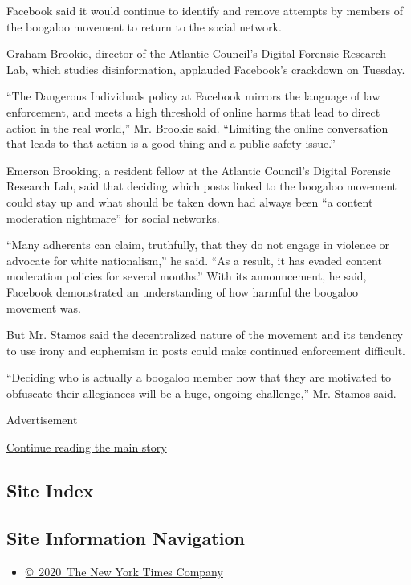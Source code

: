 Facebook said it would continue to identify and remove attempts by
members of the boogaloo movement to return to the social network.

Graham Brookie, director of the Atlantic Council's Digital Forensic
Research Lab, which studies disinformation, applauded Facebook's
crackdown on Tuesday.

``The Dangerous Individuals policy at Facebook mirrors the language of
law enforcement, and meets a high threshold of online harms that lead to
direct action in the real world,'' Mr. Brookie said. ``Limiting the
online conversation that leads to that action is a good thing and a
public safety issue.''

Emerson Brooking, a resident fellow at the Atlantic Council's Digital
Forensic Research Lab, said that deciding which posts linked to the
boogaloo movement could stay up and what should be taken down had always
been ``a content moderation nightmare'' for social networks.

``Many adherents can claim, truthfully, that they do not engage in
violence or advocate for white nationalism,'' he said. ``As a result, it
has evaded content moderation policies for several months.'' With its
announcement, he said, Facebook demonstrated an understanding of how
harmful the boogaloo movement was.

But Mr. Stamos said the decentralized nature of the movement and its
tendency to use irony and euphemism in posts could make continued
enforcement difficult.

``Deciding who is actually a boogaloo member now that they are motivated
to obfuscate their allegiances will be a huge, ongoing challenge,'' Mr.
Stamos said.

Advertisement

\protect\hyperlink{after-bottom}{Continue reading the main story}

\hypertarget{site-index}{%
\subsection{Site Index}\label{site-index}}

\hypertarget{site-information-navigation}{%
\subsection{Site Information
Navigation}\label{site-information-navigation}}

\begin{itemize}
\tightlist
\item
  \href{https://help.nytimes.com/hc/en-us/articles/115014792127-Copyright-notice}{©~2020~The
  New York Times Company}
\end{itemize}

